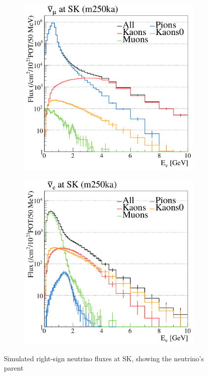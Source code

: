 \begin{figure}[h]
	\begin{subfigure}[t]{0.32\textwidth}
		\includegraphics[width=\textwidth, trim={0mm 0mm 0mm 0mm}, clip,page=1]{figures/det_chap/beam/numubar_sk_parents}
	\end{subfigure}
	\begin{subfigure}[t]{0.32\textwidth}
		\includegraphics[width=\textwidth, trim={0mm 0mm 0mm 0mm}, clip,page=1]{figures/det_chap/beam/nuebar_sk_parents}
	\end{subfigure}
	\caption{Simulated right-sign neutrino fluxes at SK, showing the neutrino's parent}
	\label{fig:flux_parents}
\end{figure}

